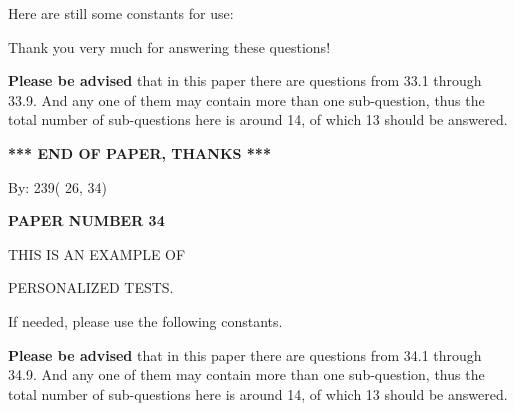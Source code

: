 \documentclass[12pt]{article}
\begin{document}
 
 
   
   
 \vspace{0.2in}
Here are still some constants for use:
 
 
 
 
Thank you very much for answering these questions!
 
{\textbf{\large{Please be advised}}} that in this paper there are questions from
33.1 through
33.9.
And any one of them may contain more than one sub-question, thus the total number
of sub-questions here is around 14, of which
13 should be answered.
 
   
   
   
   
\vspace{1.0in} 
{\textbf{\large{ *** END OF PAPER, THANKS *** }}} 
   
   
\hspace{1.0in} By: 
         239(         26,          34)
   
   
   
   
\newpage 
\setcounter{page}{ 
    34001 } 
   
   
   
   
 {\textbf{ \Large{ PAPER NUMBER          34 }}}
   
   
\vspace{0.2in}
   
   
   
   
   
   
 \vspace{0.2in}
 
 
{\Huge  THIS IS AN EXAMPLE OF}
 
{\Huge  PERSONALIZED TESTS. }
 
If needed, please use the following constants.
 
 
 
{\textbf{\large{Please be advised}}} that in this paper there are questions from
34.1 through
34.9.
And any one of them may contain more than one sub-question, thus the total number
of sub-questions here is around 14, of which
13 should be answered.
 
\vspace{0.3in}
 
 
   
   
  
\vspace{0.2in}
  
\end{document}
